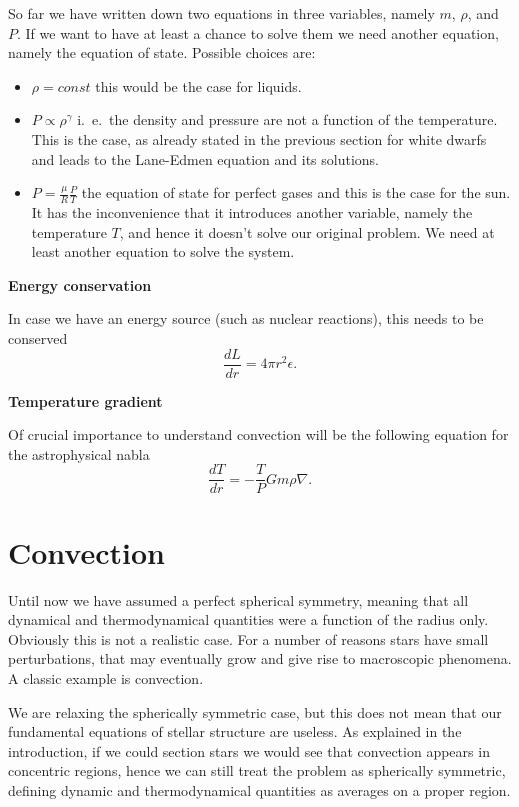 So far we have written down two equations in three variables, namely $m$, $\rho$, and $P$. If we want to have at least a chance to solve them we need another equation, namely the equation of state. Possible choices are:
\begin{itemize}
	\item $\rho=const$ this would be the case for liquids.
	\item $P\propto \rho^\gamma$ i.\ e.\ the density and pressure are not a function of the temperature. This is the case, as already stated in the previous section for white dwarfs and leads to the Lane-Edmen equation and its solutions.
	\item $P=\frac{\mu}{R}\frac{P}{T}$ the equation of state for perfect gases and this is the case for the sun. It has the inconvenience that it introduces another variable, namely the temperature $T$, and hence it doesn't solve our original problem. We need at least another equation to solve the system. 
\end{itemize}

\textbf{Energy conservation} 

In case we have an energy source (such as nuclear reactions), this needs to be conserved
\begin{equation}\label{energycons}
	\frac{dL}{dr} = 4 \pi r^2 \epsilon.
\end{equation}

\textbf{Temperature gradient} 

Of crucial importance to understand convection will be the following equation for the astrophysical nabla
\begin{equation}\label{energytransfer}
\frac{d T}{d r} = - \frac{T }{P} G m \rho\nabla.
\end{equation}


\section{Convection}
Until now we have assumed a perfect spherical symmetry, meaning that all dynamical and thermodynamical quantities were a function of the radius only. Obviously this is not a realistic case. For a number of reasons stars have small perturbations, that may eventually grow and give rise to macroscopic phenomena. A classic example is convection.

We are relaxing the spherically symmetric case, but this does not mean that our fundamental equations of stellar structure are useless. As explained in the introduction, if we could section stars we would see that convection appears in concentric regions, hence  we can still treat the problem as spherically symmetric, defining dynamic and thermodynamical quantities as averages on a proper region. 

